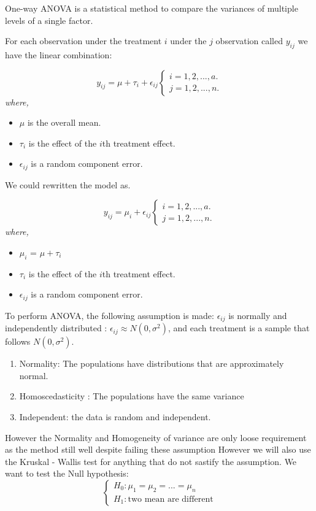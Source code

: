 One-way ANOVA is a statistical method to compare the variances of multiple levels of a single factor.

For each observation under the treatment $i$ under the $j$ observation called $y_{ij}$ we have the linear combination:

\[y_{ij} = \mu + \tau_i + \epsilon_{ij} 
\begin{cases}
    i = 1,2,...,a.\\
    j = 1,2,...,n.
\end{cases}
\]
\textit{where,}
\begin{itemize}
    \item $\mu$ is the overall mean.
    \item $\tau_i$ is the effect of the $i$th treatment effect.
    \item $\epsilon_{ij}$ is a random component error.
\end{itemize}

We could rewritten the model as.

\[y_{ij} = \mu_i + \epsilon_{ij} 
\begin{cases}
    i = 1,2,...,a.\\
    j = 1,2,...,n.
\end{cases}
\]
\textit{where,}
\begin{itemize}
    \item $\mu_i$ =  $\mu + \tau_i$
    \item $\tau_i$ is the effect of the $i$th treatment effect.
    \item $\epsilon_{ij}$ is a random component error.
\end{itemize}

To perform ANOVA, the following assumption is made: $\epsilon_{ij}$ is normally and independently 
distributed : $\epsilon_{ij} \approx N(0, \sigma^2)$, and each treatment is a sample that follows $N(0, \sigma^2)$.


\begin{enumerate}
    \item Normality: The populations have distributions that are approximately normal.
    \item Homoscedasticity  : The populations have the same variance
    \item Independent: the data is random and independent.
\end{enumerate}

However the Normality and Homogeneity of variance are only loose requirement as the method still well despite failing these assumption\cite{mont03}
However we will also use the Kruskal - Wallis test for anything that do not sastify the assumption.
We want to test the Null hypothesis:
\[
\begin{cases}
    H_0: \mu_1 = \mu_2 = ... = \mu_n \\
    H_1: \text{two mean are different}
\end{cases}
\]

